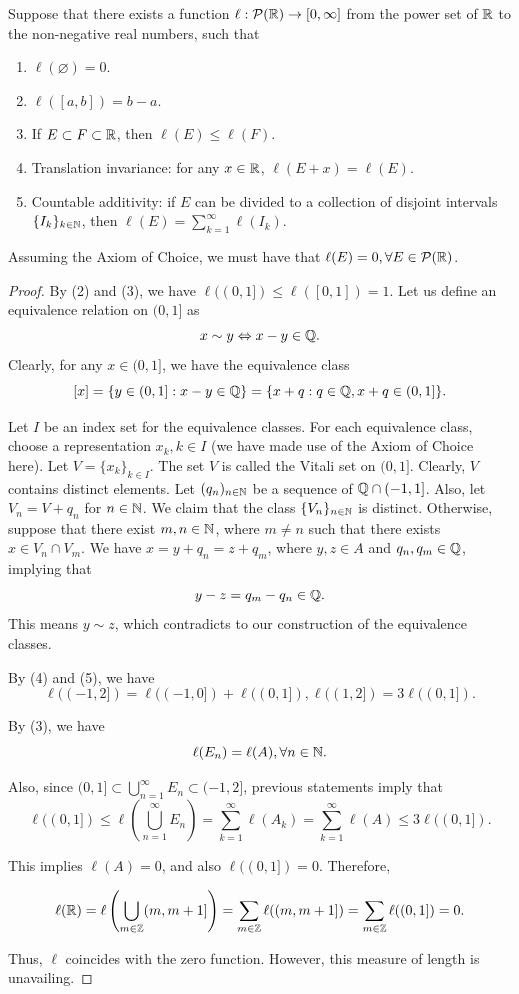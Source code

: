 \begin{proposition}
  \label{proposition-vitali-set}
  Suppose that there exists a function $\ell : \mathcal{P}(\mathbb{R}) \to [0,\infty]$ from the power set of $\mathbb{R}$ to the non-negative real numbers, such that
  \begin{enumerate}[label=(\arabic*)]
    \item $\ell(\varnothing) = 0$.
    \item $\ell([a,b]) = b-a$.
    \item If $E\subset F\subset \mathbb{R}$, then $\ell(E)\le \ell(F)$.
    \item Translation invariance: for any $x\in\mathbb{R}$, $\ell(E+x) = \ell(E)$.
    \item Countable additivity: if $E$ can be divided to a collection of disjoint intervals $\{I_k\}_{k\in \mathbb{N}}$, then $\ell(E) = \sum\limits_{k=1}^\infty \ell(I_k).$
  \end{enumerate}
  Assuming the Axiom of Choice, we must have that $\ell(E) = 0, \forall E\in \mathcal{P}(\mathbb{R})$.
\end{proposition}

\begin{proof}
  By (2) and (3), we have $\ell((0,1])\le \ell([0,1]) = 1$. Let us define an equivalence relation  on $(0,1]$ as
  $$x\sim y \Leftrightarrow x-y\in\mathbb{Q}.$$
  Clearly, for any $x\in (0,1]$, we have the equivalence class
  $$[x] = \{y\in(0,1] : x-y\in \mathbb{Q}\} = \{x+q: q\in \mathbb{Q}, x+q\in (0,1]\}.$$

  Let $I$ be an index set for the equivalence classes. For each equivalence class, choose a representation $x_k, k \in I$ (we have made use of the Axiom of Choice here). Let $V=\{x_k\}_{k\in I}$. The set $V$ is called the Vitali set on $(0,1]$. Clearly, $V$ contains distinct elements. Let $(q_n)_{n\in\mathbb{N}}$ be a sequence of $\mathbb{Q}\cap(-1,1]$. Also, let $V_n = V + q_n$ for $n\in\mathbb{N}$. We claim that the class $\{V_n\}_{n\in\mathbb{N}}$ is distinct. Otherwise, suppose that there exist $m,n\in \mathbb{N}$, where $m\ne n$ such that there exists $x\in V_n\cap V_m$. We have $x=y + q_n = z + q_m$, where $y,z\in A$ and $q_n,q_m\in\mathbb{Q}$, implying that
  $$y-z = q_m-q_n\in \mathbb{Q}.$$
  This means $y\sim z$, which contradicts to our construction of the equivalence classes.

  By (4) and (5), we have
  $$\ell((-1,2]) = \ell((-1,0]) + \ell((0,1]), \ell((1,2]) = 3\ell((0,1]).$$

  By (3), we have
  $$\ell(E_n) = \ell (A), \forall n\in\mathbb{N}.$$

  Also, since $(0,1] \subset \bigcup\limits_{n=1}^\infty E_n \subset (-1,2]$, previous statements imply that
  $$\ell((0,1]) \le \ell\left(\bigcup\limits_{n=1}^\infty E_n\right) = \sum\limits_{k=1}^{\infty} \ell(A_k) = \sum_{k=1}^{\infty} \ell(A) \le 3\ell((0,1]).$$

  This implies $\ell(A)=0$, and also $\ell((0,1])=0$. Therefore,

  $$\ell(\mathbb{R}) = \ell\left(\bigcup\limits_{m\in\mathbb{Z}}(m,m+1] \right) = \sum\limits_{m\in\mathbb{Z}} \ell((m,m+1])= \sum\limits_{m\in\mathbb{Z}} \ell((0,1]) = 0.$$

  Thus, $\ell$ coincides with the zero function. However, this measure of length is unavailing.
\end{proof}

